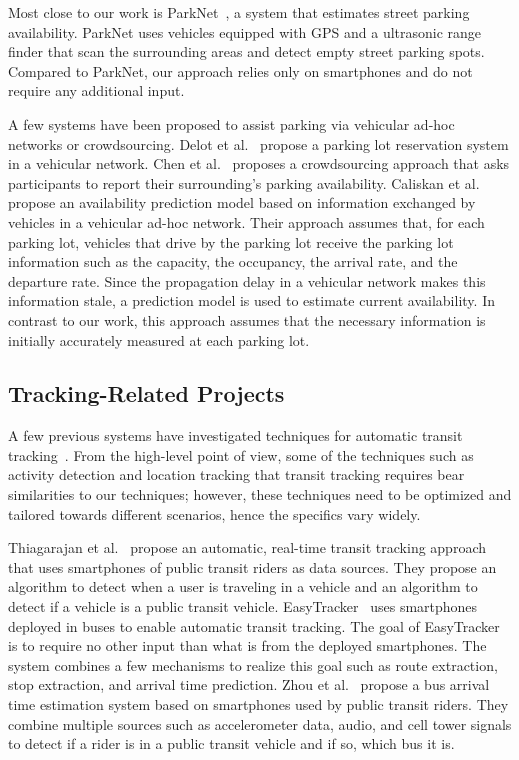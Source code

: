 Most close to our work is ParkNet~\cite{Mathur:2010:PDS}, a system that
estimates street parking availability. ParkNet uses vehicles equipped with GPS
and a ultrasonic range finder that scan the surrounding areas and detect
empty street parking spots. Compared to ParkNet, our approach relies only on
smartphones and do not require any additional input.

A few systems have been proposed to assist parking via vehicular ad-hoc
networks or crowdsourcing. Delot et al.~\cite{Delot:2009:CRP} propose a parking
lot reservation system in a vehicular network. Chen et al.~\cite{Chen:2012:COS}
proposes a crowdsourcing approach that asks participants to report their
surrounding's parking availability. Caliskan et al.~\cite{4212497} propose an
availability prediction model based on information exchanged by vehicles in a
vehicular ad-hoc network. Their approach assumes that, for each parking lot,
vehicles that drive by the parking lot receive the parking lot information such
as the capacity, the occupancy, the arrival rate, and the departure rate. Since
the propagation delay in a vehicular network makes this information stale, a
prediction model is used to estimate current availability. In contrast to
our work, this approach assumes that the necessary information is initially
accurately measured at each parking lot.

\subsection{Tracking-Related Projects}

A few previous systems have investigated techniques for automatic transit
tracking~\cite{Biagioni:2011:EAT, Thiagarajan:2010:CTT, Zhou:2012:LWP}. From the
high-level point of view, some of the techniques such as activity detection and
location tracking that transit tracking requires bear similarities to
our techniques; however, these techniques need to be optimized and tailored
towards different scenarios, hence the specifics vary widely.

Thiagarajan et al.~\cite{Thiagarajan:2010:CTT} propose an automatic, real-time
transit tracking approach that uses smartphones of public transit riders as data
sources. They propose an algorithm to detect when a user is traveling in a
vehicle and an algorithm to detect if a vehicle is a public transit vehicle.
EasyTracker~\cite{Biagioni:2011:EAT} uses smartphones deployed in buses to
enable automatic transit tracking. The goal of EasyTracker is to require no
other input than what is from the deployed smartphones. The system combines a
few mechanisms to realize this goal such as route extraction, stop extraction,
and arrival time prediction. Zhou et al.~\cite{Zhou:2012:LWP} propose a bus
arrival time estimation system based on smartphones used by public transit
riders. They combine multiple sources such as accelerometer data, audio, and
cell tower signals to detect if a rider is in a public transit vehicle and if
so, which bus it is.

